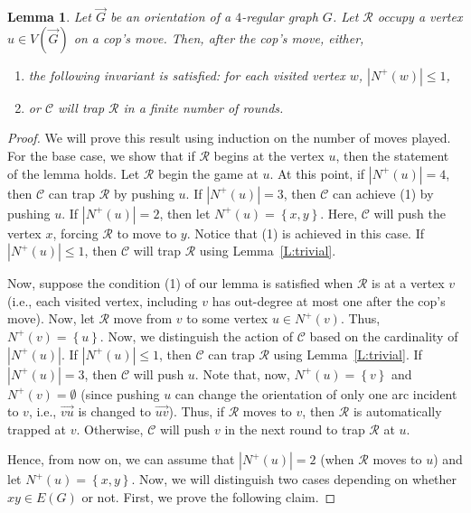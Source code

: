 \documentclass[a4paper,12pt]{amsart}
\newtheorem{lemma}[theorem]{Lemma}
\newtheorem{claim}[theorem]{Claim}
\newcommand{\set}[1]{\left\{#1\right\}}
\newcommand{\R}{\mathcal{R}}
\newcommand{\C}{\mathcal{C}}
\let\leq\leqslant
\begin{document}
\begin{lemma}\label{L:regular}
    Let $\overrightarrow{G}$ be an orientation of a $4$-regular graph $G$. Let $\R$ occupy a vertex $u\in V(\overrightarrow{G})$ on a cop's move. Then, after the cop's move, either, 
    \begin{enumerate}
        \item the following invariant is satisfied: for each visited vertex $w$, $|N^+(w)| \leq 1$, 
        \item or $\C$ will trap $\R$ in a finite number of rounds.
    \end{enumerate}
\end{lemma}
\begin{proof}
    We will prove this result using induction on the number of moves played. For the base case, we show that if $\R$ begins at the vertex $u$, then the statement of the lemma holds. Let $\R$ begin the game at $u$. At this point, if $|N^+(u)| = 4$, then $\C$ can trap $\R$ by pushing $u$. If $|N^+(u)| = 3$, then $\C$ can achieve (1) by pushing $u$. If $|N^+(u)| = 2$, then let $N^+(u)= \set{x,y}$. Here, $\C$ will push the vertex $x$, forcing $\R$ to move to $y$. Notice that  (1) is achieved in this case. If $|N^+(u)|\leq 1$, then $\C$ will trap $\R$ using Lemma~\ref{L:trivial}. 

    Now, suppose the condition (1) of our lemma is satisfied when $\R$ is at a vertex $v$ (i.e., each visited vertex, including $v$ has out-degree at most one after the cop's move). Now, let $\R$ move from $v$ to some vertex $u\in N^+(v)$. Thus, $N^+(v) = \set{u}$. Now, we distinguish the action of $\C$ based on the cardinality of $|N^+(u)|$. If $|N^+(u)| \leq 1$, then $\C$ can trap $\R$ using Lemma~\ref{L:trivial}. If $|N^+(u)| = 3$, then $\C$ will push $u$. Note that, now, $N^+(u) = \set{v}$ and $N^+(v) = \emptyset$ (since pushing $u$ can change the orientation of only one arc incident to $v$, i.e.,  $\overrightarrow{vu}$ is changed to $\overrightarrow{uv}$). Thus, if $\R$ moves to $v$, then $\R$ is automatically trapped at $v$. Otherwise, $\C$ will push $v$ in the next round to trap $\R$ at $u$. 
    
    Hence, from now on, we can assume that $|N^+(u)| = 2$ (when $\R$ moves to $u$) and let $N^+(u) = \set{x,y}$. Now, we will distinguish two cases  depending on whether $xy\in E(G)$ or not. First, we prove the following claim.


\end{proof}
\end{document}
